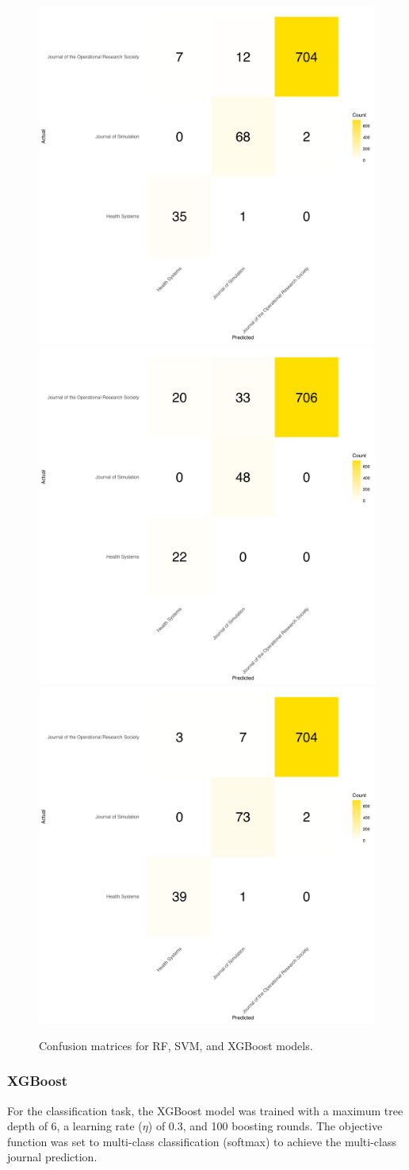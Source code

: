 \documentclass[9pt,twocolumn,twoside]{pnas-new}
\begin{document}
\begin{figure}%
\centering
\includegraphics[width=.45\linewidth]{class/conf_RandomForest.png}
\includegraphics[width=.45\linewidth]{class/conf_SVM.png}
\includegraphics[width=.45\linewidth]{class/conf_XGBoost.png}
\caption{Confusion matrices for RF, SVM, and XGBoost models.}
\label{fig:class_con}
\end{figure}

\subsubsection*{XGBoost}

For the classification task, the XGBoost model was trained with a maximum tree depth of 6, a learning rate ($\eta$) of 0.3, and 100 boosting rounds. The objective function was set to multi-class classification (softmax) to achieve the multi-class journal prediction.
\end{document}
